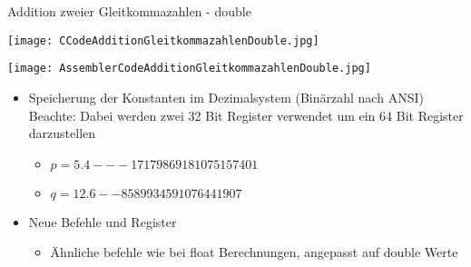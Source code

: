 			\vspace{1.5cm}
			\centerline{Addition zweier Gleitkommazahlen - double}
			\begin{minipage}{0.5\textwidth}
				\begin{center}
					\texttt{[image: CCodeAdditionGleitkommazahlenDouble.jpg]}
				\end{center}
			\end{minipage}
			\begin{minipage}{0.45\textwidth}
				\begin{center}
					\texttt{[image: AssemblerCodeAdditionGleitkommazahlenDouble.jpg]}
				\end{center}
			\end{minipage}

			\begin{itemize}
				\item Speicherung der Konstanten im Dezimalsystem (Binärzahl nach ANSI) \\
					Beachte: Dabei werden zwei 32 Bit Register verwendet um ein 64 Bit Register darzustellen
					\begin{itemize}
						\item $p = 5.4 -- -1717986918 1075157401$
						\item $q = 12.6 -- 858993459 1076441907$
					\end{itemize}
				\item Neue Befehle und Register
					\begin{itemize}
						\item Ähnliche befehle wie bei float Berechnungen, angepasst auf double Werte
					\end{itemize}
			\end{itemize}


